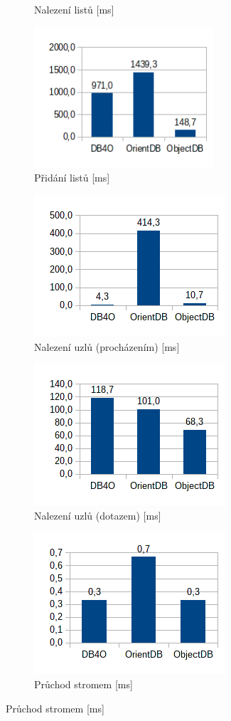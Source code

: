 \begin{figure}[!h]
\begin{subfigure}[b]{0.5\textwidth}
  \caption{Nalezení listů [ms]}\label{img:oodbms4}
  \end{subfigure}
  \begin{subfigure}[b]{0.5\textwidth}
  \includegraphics[width=18em]{obr/bench/oodbms5}
  \caption{Přidání listů [ms]}\label{img:oodbms5}
  \end{subfigure}
  \begin{subfigure}[b]{0.5\textwidth}
  \includegraphics[]{obr/bench/oodbms6}
  \caption{Nalezení uzlů (procházením) [ms]}\label{img:oodbms6}
  \end{subfigure}
  \begin{subfigure}[b]{0.5\textwidth}
  \includegraphics[]{obr/bench/oodbms7}
  \caption{Nalezení uzlů (dotazem) [ms]}\label{img:oodbms7}
  \end{subfigure}
  \begin{subfigure}[b]{0.5\textwidth}
  \includegraphics[]{obr/bench/oodbms8}
  \caption{Průchod stromem [ms]}\label{img:oodbms8}
  \end{subfigure}
\end{figure}
